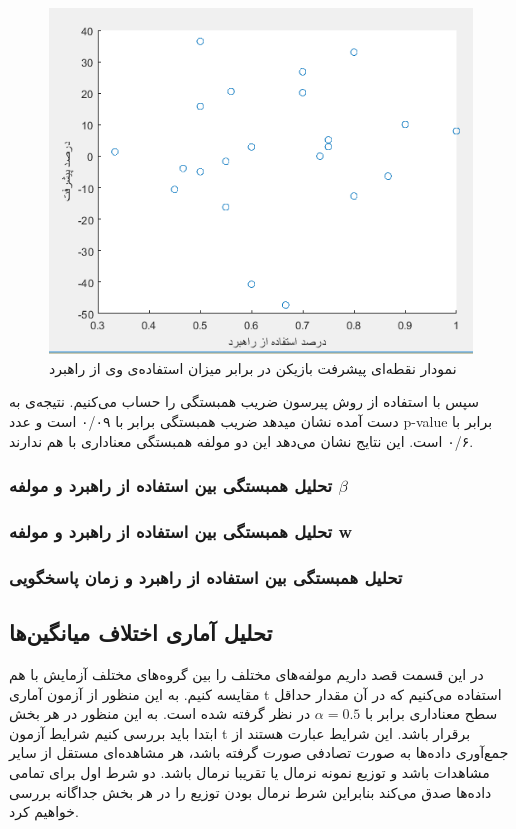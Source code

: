 \documentclass[twoside, a4paper,11pt]{book}
\numberwithin{equation}{chapter}
\numberwithin{table}{chapter}
\numberwithin{figure}{chapter}
\numberwithin{equation}{chapter}
\begin{document}
\begin{figure}
\centering
\includegraphics[scale=0.8]{Figures/impv1strUseScatter.png}
\caption{\label{fig:impv1strUseScatter}
نمودار نقطه‌ای پیشرفت بازیکن در برابر میزان استفاده‌ی وی از راهبرد
}
\end{figure}

سپس با استفاده از روش پیرسون ضریب همبستگی را حساب می‌کنیم. نتیجه‌ی به دست آمده نشان میدهد ضریب همبستگی برابر با ۰/۰۹ است و عدد p-value برابر با ۰/۶ است. این نتایج نشان می‌دهد این دو مولفه همبستگی معناداری با هم ندارند.

\subsubsection{تحلیل همبستگی بین استفاده از راهبرد و مولفه $\beta$}
\subsubsection{تحلیل همبستگی بین استفاده از راهبرد و مولفه w }
\subsubsection{تحلیل همبستگی بین استفاده از راهبرد و زمان پاسخگویی}

\subsection{تحلیل آماری اختلاف میانگین‌ها}
در این قسمت قصد داریم مولفه‌های مختلف را بین گروه‌های مختلف آزمایش با هم مقایسه کنیم. به این منظور از آزمون آماری t  استفاده می‌کنیم که در آن مقدار حداقل سطح معناداری برابر با  $\alpha = 0.5$ در نظر گرفته شده است. به این منظور در هر بخش ابتدا باید بررسی کنیم شرایط آزمون t برقرار باشد. این شرایط عبارت هستند از جمع‌آوری داده‌ها به صورت تصادفی صورت گرفته باشد، هر مشاهده‌ای مستقل از سایر مشاهدات باشد و توزیع نمونه نرمال یا تقریبا نرمال باشد. دو شرط اول برای تمامی داده‌ها صدق می‌کند بنابراین شرط نرمال بودن توزیع را در هر بخش جداگانه بررسی خواهیم کرد.
\end{document}
